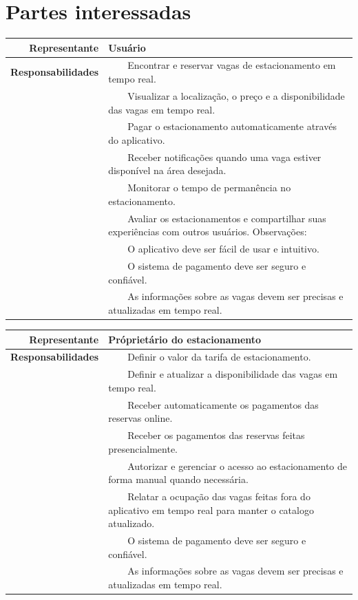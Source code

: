 \documentclass[a4paper,12pt]{article}
\newcommand{\tabitem}{~~\llap{\textbullet}~~}
\begin{document}
\section{Partes interessadas} %

\begin{table}[h!]
    \begin{tabularx}{\linewidth}{ | r | X | }
        \hline
        \bf{Representante} & \bf{Usuário} \\
        \hline
        \bf{Responsabilidades} & \tabitem{Encontrar e reservar vagas de estacionamento em tempo real.} \\
         & \tabitem{Visualizar a localização, o preço e a disponibilidade das vagas em tempo real.} \\
         & \tabitem{Pagar o estacionamento automaticamente através do aplicativo.} \\
         & \tabitem{Receber notificações quando uma vaga estiver disponível na área desejada.} \\
         & \tabitem{Monitorar o tempo de permanência no estacionamento.} \\
         & \tabitem{Avaliar os estacionamentos e compartilhar suas experiências com outros usuários. Observações:} \\
         & \tabitem{O aplicativo deve ser fácil de usar e intuitivo.} \\
         & \tabitem{O sistema de pagamento deve ser seguro e confiável.} \\
         & \tabitem{As informações sobre as vagas devem ser precisas e atualizadas em tempo real.} \\
        \hline
    \end{tabularx}
\end{table}


\begin{table}[h!]
    \begin{tabularx}{\linewidth}{ | r | X | }
        \hline
        \bf{Representante} & \bf{Próprietário do estacionamento} \\
        \hline
        \bf{Responsabilidades} &\tabitem{Definir o valor da tarifa de estacionamento.} \\
         & \tabitem{Definir e atualizar a disponibilidade das vagas em tempo real.} \\
         & \tabitem{Receber automaticamente os pagamentos das reservas online.} \\
         & \tabitem{Receber os pagamentos das reservas feitas presencialmente.} \\
         & \tabitem{Autorizar e gerenciar o acesso ao estacionamento de forma manual quando necessária.} \\
         & \tabitem{Relatar a ocupação das vagas feitas fora do aplicativo em tempo real para manter o catalogo atualizado.} \\
         & \tabitem{O sistema de pagamento deve ser seguro e confiável.} \\
         & \tabitem{As informações sobre as vagas devem ser precisas e atualizadas em tempo real.} \\
        \hline
    \end{tabularx}
\end{table}
\end{document}
